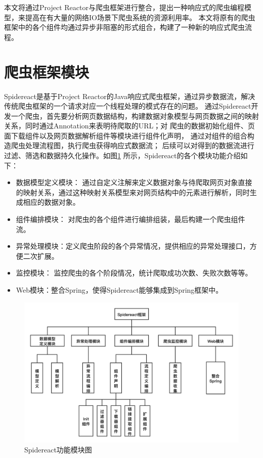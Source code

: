 \documentclass[master]{njuthesis}
\begin{document}
本文将通过Project Reactor与爬虫框架进行整合，提出一种响应式的爬虫编程模型，来提高在有大量的网络IO场景下爬虫系统的资源利用率。
本文将原有的爬虫框架中的各个组件均通过异步非阻塞的形式组合，构建了一种新的响应式爬虫流程。

\section{爬虫框架模块}
  Spidereact是基于Project Reactor的Java响应式爬虫框架，通过异步数据流，解决传统爬虫框架的一个请求对应一个线程处理的模式存在的问题。
通过Spidereact开发一个爬虫，首先要分析网页数据结构，构建数据对象模型与网页数据之间的映射关系，同时通过Annotation来表明待爬取的URL；对
爬虫的数据初始化组件、页面下载组件以及网页数据解析组件等模块进行组件化声明， 通过对组件的组合构造爬虫处理流程图，执行爬虫获得响应式数据流；
后续可以对得到的数据流进行过滤、筛选和数据持久化操作。如图\ref{pic:all} 所示，Spidereact的各个模块功能介绍如下：
  \begin{itemize}
    \item 数据模型定义模块： 通过自定义注解来定义数据对象与待爬取网页对象直接的映射关系，通过这种映射关系模型来对网页结构中的元素进行解析，同时生成相应的数据对象。
    \item 组件编排模块： 对爬虫的各个组件进行编排组装，最后构建一个爬虫组件流。
    \item 异常处理模块：定义爬虫阶段的各个异常情况，提供相应的异常处理接口，方便二次扩展。
    \item 监控模块： 监控爬虫的各个阶段情况，统计爬取成功次数、失败次数等等。
    \item Web模块：整合Spring，使得Spidereact能够集成到Spring框架中。
  \end{itemize}

\begin{figure}
\centering
\includegraphics[width=\textwidth]{pic/all.png}
\caption{Spidereact功能模块图}\label{pic:all}
\end{figure}
\end{document}
